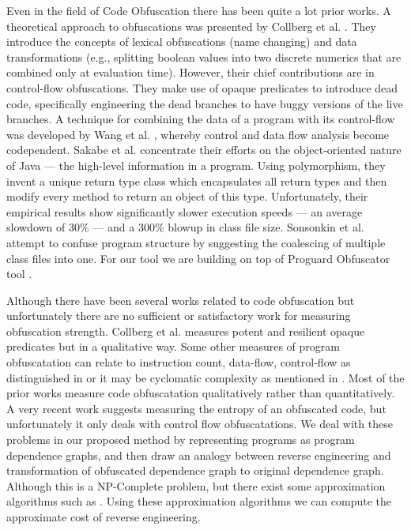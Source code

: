 \documentclass[conference]{IEEEtran}
\begin{document}
Even in the field of Code Obfuscation there has been quite a lot prior works. A theoretical approach to obfuscations was presented by Collberg et al. \cite{collberg}. They introduce 
the concepts of lexical obfuscations (name changing) and data transformations (e.g., splitting boolean values into two discrete numerics that are combined only at evaluation time). 
However, their chief contributions are in control-flow obfuscations. They make use of opaque predicates to introduce dead code, specifically engineering the dead branches to have buggy 
versions of the live branches. A technique for combining the data of a program with its control-flow was developed by Wang et al. \cite{wang}, whereby control and data flow analysis become 
codependent. Sakabe et al. \cite{sakabe} concentrate their efforts on the object-oriented nature of Java — the high-level information in a program. Using polymorphism, they invent a 
unique return type class which encapsulates all return types and then modify every method to return an object of this type. Unfortunately, their empirical results show significantly 
slower execution speeds — an average slowdown of $30\%$ — and a $300\%$ blowup in class file size. Sonsonkin et al. \cite{sonsonkin} attempt to confuse program structure by suggesting the coalescing of 
multiple class files into one. For our tool we are building on top of Proguard Obfuscator tool \cite{proguard}.

Although there have been several works related to code obfuscation but unfortunately there are no sufficient or satisfactory work for measuring obfuscation strength. Collberg et al. 
\cite{collberg} measures potent and resilient opaque predicates but in a qualitative way. Some other measures of program obfuscatation can relate to instruction count, data-flow, 
control-flow as distinguished in \cite{sutter} or it may be cyclomatic complexity as mentioned in \cite{McCabe}. Most of the prior works measure code obfuscatation qualitatively rather 
than quantitatively. A very recent work \cite{entropy} suggests measuring the entropy of an obfuscated code, but unfortunately it only deals with control flow obfuscatations. We deal 
with these problems in our proposed method by representing programs as program dependence graphs, and then draw an analogy between reverse engineering and transformation of obfuscated 
dependence graph to original dependence graph. Although this is a NP-Complete problem, but there exist some approximation algorithms such as \cite{Demaine05}. Using these approximation 
algorithms we can compute the approximate cost of reverse engineering.
\end{document}
